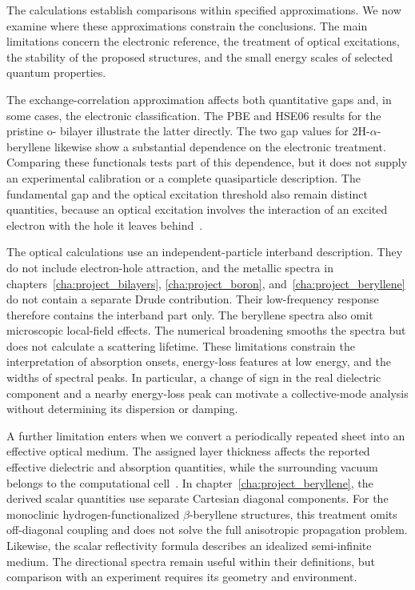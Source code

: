 The calculations establish comparisons within specified approximations.
We now examine where these approximations constrain the conclusions.
The main limitations concern the electronic reference, the treatment of optical excitations, the stability of the proposed structures, and the small energy scales of selected quantum properties.

The exchange-correlation approximation affects both quantitative gaps and, in some cases, the electronic classification.
The PBE and HSE06 results for the pristine o- bilayer illustrate the latter directly.
The two gap values for 2H-$\alpha$-beryllene likewise show a substantial dependence on the electronic treatment.
Comparing these functionals tests part of this dependence, but it does not supply an experimental calibration or a complete quasiparticle description.
The fundamental gap and the optical excitation threshold also remain distinct quantities, because an optical excitation involves the interaction of an excited electron with the hole it leaves behind~\cite{onida2002electronic,thygesen2017}.

The optical calculations use an independent-particle interband description.
They do not include electron-hole attraction, and the metallic spectra in chapters~\ref{cha:project_bilayers}, \ref{cha:project_boron}, and~\ref{cha:project_beryllene} do not contain a separate Drude contribution.
Their low-frequency response therefore contains the interband part only.
The beryllene spectra also omit microscopic local-field effects.
The numerical broadening smooths the spectra but does not calculate a scattering lifetime.
These limitations constrain the interpretation of absorption onsets, energy-loss features at low energy, and the widths of spectral peaks.
In particular, a change of sign in the real dielectric component and a nearby energy-loss peak can motivate a collective-mode analysis without determining its dispersion or damping.

A further limitation enters when we convert a periodically repeated sheet into an effective optical medium.
The assigned layer thickness affects the reported effective dielectric and absorption quantities, while the surrounding vacuum belongs to the computational cell~\cite{matthes2016influence}.
In chapter~\ref{cha:project_beryllene}, the derived scalar quantities use separate Cartesian diagonal components.
For the monoclinic hydrogen-functionalized $\beta$-beryllene structures, this treatment omits off-diagonal coupling and does not solve the full anisotropic propagation problem.
Likewise, the scalar reflectivity formula describes an idealized semi-infinite medium.
The directional spectra remain useful within their definitions, but comparison with an experiment requires its geometry and environment.

